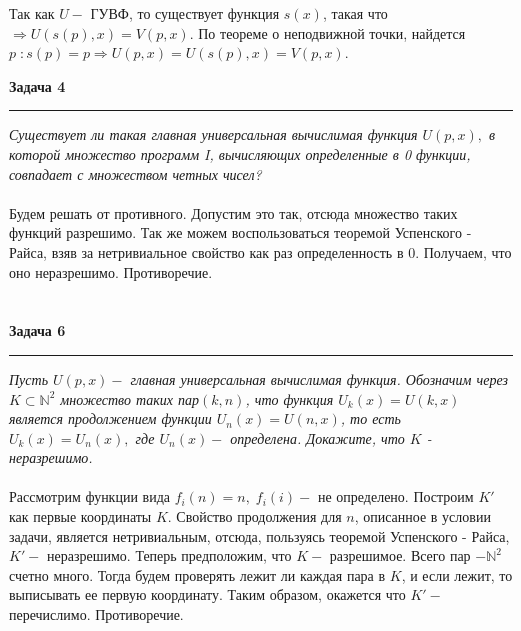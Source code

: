 \documentclass[a4paper,11pt]{article}
\begin{document}
Так как $ U - $ ГУВФ, то существует функция $ s(x) $, такая что  $ \Rightarrow U(s(p), x) = V(p, x)$. По теореме о неподвижной точки, найдется $ p \; : s(p) = p \Rightarrow U(p, x) = U(s(p), x) = V(p, x) $.
\newpage







\textbf{\large Задача 4}
\medskip\hrule\medskip
\textit{Существует ли такая главная универсальная вычислимая функция $ U(p, x),$ в которой множество программ I, вычисляющих определенные в 0 функции, совпадает с множеством четных чисел?} \\ \\ 

Будем решать от противного. Допустим это так, отсюда множество таких функций разрешимо. Так же можем воспользоваться теоремой Успенского - Райса, взяв за нетривиальное свойство как раз определенность в 0. Получаем, что оно неразрешимо. Противоречие.
\\ \\ \\







\textbf{\large Задача 6}
\medskip\hrule\medskip
\textit{Пусть $ U(p, x) - $ главная универсальная вычислимая функция. Обозначим через $ K \subset \mathbb{N}^2 $ множество таких пар$ (k, n) $, что функция $ U_k(x) = U(k, x) $ является продолжением функции $ U_n(x) = U(n, x) $, то есть $  U_k(x) = U_n(x), $ где $ U_n(x) - $ определена. Докажите, что $ K $ - неразрешимо.} \\ \\ 

Рассмотрим функции вида $ f_i(n) = n, \; f_i(i) - $ не определено. Построим $ K' $ как первые координаты $ K $. Свойство продолжения для $ n $, описанное в условии задачи, является нетривиальным, отсюда, пользуясь теоремой Успенского - Райса, $ K' - $ неразрешимо. Теперь предположим, что $ K - $ разрешимое. Всего пар $ - \mathbb{N}^2 $ счетно много. Тогда будем проверять лежит ли каждая пара в $ K $, и если лежит, то выписывать ее первую координату. Таким образом, окажется что $ K' -  $ перечислимо. Противоречие.  
\end{document}

